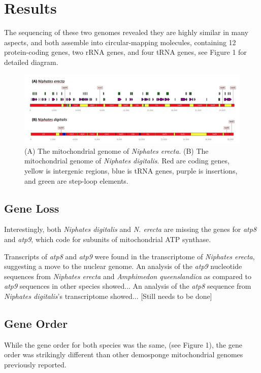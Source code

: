 \documentclass[../main.tex]{subfiles}
\begin{document}
\section{Results}

The sequencing of these two genomes revealed they are highly similar in many aspects, and both assemble into circular-mapping molecules, containing 12 protein-coding genes, two rRNA genes, and four tRNA genes, see Figure 1 for detailed diagram.

\begin{figure}[htp]
    \centering
    \includegraphics[width=1.0\textwidth]{Figures/figure 1.png}
    \caption{(A) The mitochondrial genome of \emph{Niphates erecta}. (B) The mitochondrial genome of \emph{Niphates digitalis}. Red are coding genes, yellow is intergenic regions, blue is tRNA genes, purple is insertions, and green are step-loop elements.}
\end{figure}

\subsection{Gene Loss}
Interestingly, both \emph{Niphates digitalis} and \emph{N. erecta} are missing the genes for \emph{atp8} and \emph{atp9}, which code for subunits of mitochondrial ATP synthase.  

Transcripts of \emph{atp8} and \emph{atp9} were found in the transcriptome of \emph{Niphates erecta}, suggesting a move to the nuclear genome. An analysis of the \emph{atp9} nucleotide sequences from \emph{Niphates erecta} and \emph{Amphimedon queenslandica} as compared to \emph{atp9} sequences in other species showed... An analysis of the \emph{atp8} sequence from \emph{Niphates digitalis}'s transcriptome showed... [Still needs to be done]

\subsection{Gene Order}
While the gene order for both species was the same, (see Figure 1), the gene order was strikingly different than other demosponge mitochondrial genomes previously reported. 
\end{document}
